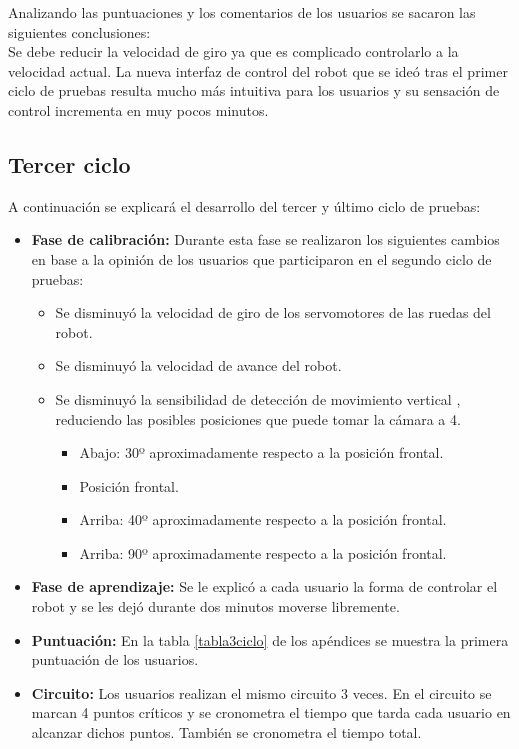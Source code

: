\documentclass[twoside, 11pt]{epstfg}
\begin{document}
Analizando las puntuaciones y los comentarios de los usuarios se sacaron las siguientes conclusiones:\\
Se debe reducir la velocidad de giro ya que es complicado controlarlo a la velocidad actual.
La nueva interfaz de control del robot que se ideó tras el primer ciclo de pruebas resulta mucho más intuitiva para los usuarios y su sensación de control incrementa en muy pocos minutos.

\subsection{Tercer ciclo}

A continuación se explicará el desarrollo del tercer y último ciclo de pruebas:
\begin{itemize}
	\item \textbf{Fase de calibración:} Durante esta fase se realizaron los siguientes cambios en base a la opinión de los usuarios que participaron en el segundo ciclo de pruebas:
	\begin{itemize}
		\item Se disminuyó la velocidad de giro de los servomotores de las ruedas del robot.
		\item Se disminuyó la velocidad de avance del robot.
		\item Se disminuyó la sensibilidad de detección de movimiento vertical , reduciendo las posibles posiciones que puede tomar la cámara a 4.
		\begin{itemize}
			\item Abajo: 30º aproximadamente respecto a la posición frontal.
			\item Posición frontal.
			\item Arriba: 40º aproximadamente respecto a la posición frontal.
			\item Arriba: 90º aproximadamente respecto a la posición frontal.
		\end{itemize}
	\end{itemize}
	\item \textbf{Fase de aprendizaje:} Se le explicó a cada usuario la forma de controlar el robot y se les dejó durante dos minutos moverse libremente.
	\item \textbf{Puntuación: } En la tabla \ref{tabla3ciclo} de los apéndices se muestra la primera puntuación de los usuarios.
	

\item \textbf{Circuito:} Los usuarios realizan el mismo circuito 3 veces. En el circuito se marcan 4 puntos críticos y se cronometra el tiempo que tarda cada usuario en alcanzar dichos puntos. También se cronometra el tiempo total.


\end{itemize}
\end{document}
